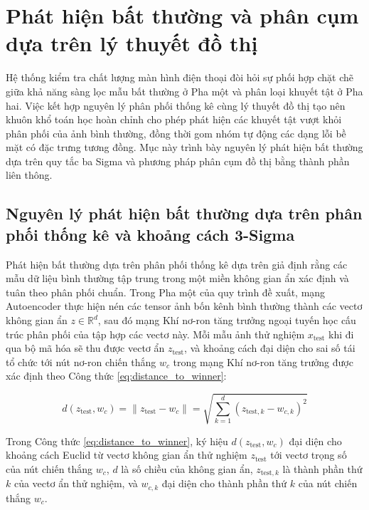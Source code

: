 \section{Phát hiện bất thường và phân cụm dựa trên lý thuyết đồ thị}

Hệ thống kiểm tra chất lượng màn hình điện thoại đòi hỏi sự phối hợp chặt chẽ giữa khả năng sàng lọc mẫu bất thường ở Pha một và phân loại khuyết tật ở Pha hai. Việc kết hợp nguyên lý phân phối thống kê cùng lý thuyết đồ thị tạo nên khuôn khổ toán học hoàn chỉnh cho phép phát hiện các khuyết tật vượt khỏi phân phối của ảnh bình thường, đồng thời gom nhóm tự động các dạng lỗi bề mặt có đặc trưng tương đồng. Mục này trình bày nguyên lý phát hiện bất thường dựa trên quy tắc ba Sigma và phương pháp phân cụm đồ thị bằng thành phần liên thông.

\subsection{Nguyên lý phát hiện bất thường dựa trên phân phối thống kê và khoảng cách 3-Sigma}

Phát hiện bất thường dựa trên phân phối thống kê dựa trên giả định rằng các mẫu dữ liệu bình thường tập trung trong một miền không gian ẩn xác định và tuân theo phân phối chuẩn. Trong Pha một của quy trình đề xuất, mạng Autoencoder thực hiện nén các tensor ảnh bốn kênh bình thường thành các vectơ không gian ẩn $z \in \mathbb{R}^d$, sau đó mạng Khí nơ-ron tăng trưởng ngoại tuyến học cấu trúc phân phối của tập hợp các vectơ này. Mỗi mẫu ảnh thử nghiệm $x_{\text{test}}$ khi đi qua bộ mã hóa sẽ thu được vectơ ẩn $z_{\text{test}}$, và khoảng cách đại diện cho sai số tái tổ chức tới nút nơ-ron chiến thắng $w_c$ trong mạng Khí nơ-ron tăng trưởng được xác định theo Công thức \ref{eq:distance_to_winner}:

\begin{equation}
d(z_{\text{test}}, w_c) = \| z_{\text{test}} - w_c \| = \sqrt{\sum_{k=1}^{d} \left( z_{\text{test}, k} - w_{c, k} \right)^2}
\label{eq:distance_to_winner}
\end{equation}

Trong Công thức \ref{eq:distance_to_winner}, ký hiệu $d(z_{\text{test}}, w_c)$ đại diện cho khoảng cách Euclid từ vectơ không gian ẩn thử nghiệm $z_{\text{test}}$ tới vectơ trọng số của nút chiến thắng $w_c$, $d$ là số chiều của không gian ẩn, $z_{\text{test}, k}$ là thành phần thứ $k$ của vectơ ẩn thử nghiệm, và $w_{c, k}$ đại diện cho thành phần thứ $k$ của nút chiến thắng $w_c$.

